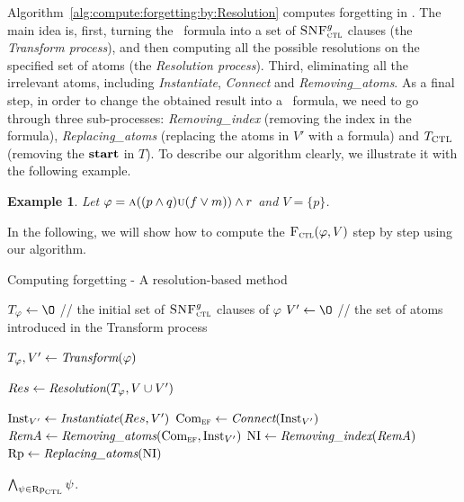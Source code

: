 \documentclass{article}
\newtheorem{example}{Example}
\begin{document}
Algorithm~\ref{alg:compute:forgetting:by:Resolution} computes forgetting in \CTL.
The main idea is, first, turning the \CTL\ formula into a set of ${\textsc{SNF}_{\textsc{ctl}}^g}$ clauses (the \emph{Transform process}), and then computing all the possible resolutions on the specified set of atoms (the \emph{Resolution process}). Third, eliminating all the irrelevant atoms, including \emph{Instantiate}, \emph{Connect} and \emph{Removing\_atoms}. %
As a final step, in order to change the obtained result into a \CTL\ formula, we need to go through three sub-processes: \emph{Removing\_index} (removing the index in the formula), \emph{Replacing\_atoms} (replacing the atoms in $V'$ with a formula) and $T_{\textrm{CTL}}$ (removing the $\textbf{start}$ in $T$).
To describe our algorithm clearly, we illustrate it with the following example.
\begin{example}\label{main:examp}
Let $\varphi=\textsc{a}((p\wedge q) \textsc{u} (f\vee m)) \wedge r$ and $V=\{p\}$.
\end{example}
In the following, we will show how to compute the ${\textsc{F}_{\textsc{ctl}}}(\varphi, V)$ step by step using our algorithm.


\begin{algorithm}[!h]
\caption{Computing forgetting - A resolution-based method}%
\label{alg:compute:forgetting:by:Resolution}
$T_{\varphi}\lto {\O}$ // the initial set of ${\textsc{SNF}_{\textsc{ctl}}^g}$ clauses of $\varphi$ \;
$V'\lto {\O}$ // the set of atoms introduced in the Transform process\;


$T_{\varphi}, V' \leftarrow \emph{Transform}(\varphi)$\;

$Res \leftarrow \emph{Resolution}(T_{\varphi}, V\cup V')$ \;

$\textrm{Inst}_{V'} \leftarrow \emph{Instantiate}(Res, V')$ \;
$\textrm{Com}_{\textsc{e}\textsc{f}} \leftarrow \emph{Connect}(\textrm{Inst}_{V'})$  \;
$\emph{RemA} \leftarrow \emph{Removing\_atoms}(\textrm{Com}_{\textsc{e}\textsc{f}}, \textrm{Inst}_{V'})$ \;
$\textrm{NI} \leftarrow \emph{Removing\_index}(\emph{RemA})$ \;
$\textrm{Rp} \leftarrow \emph{Replacing\_atoms}(\textrm{NI})$\;

\Return $\bigwedge_{\psi \in \textrm{Rp}_{\textrm{CTL}}} \psi$.
\end{algorithm}
\end{document}
